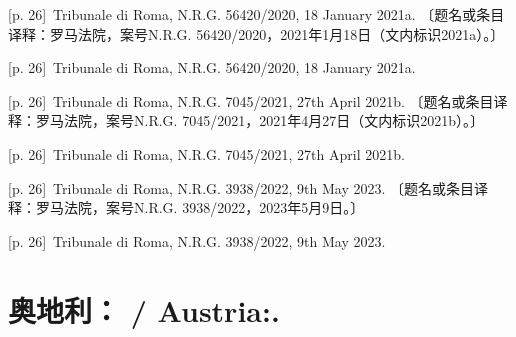\documentclass[10pt,a4paper]{article}
\begin{document}
\noindent\begin{minipage}{\textwidth}\begin{minipage}[t]{\dimexpr.5\textwidth-4mm\relax}{\scriptsize\color{gray} [p. 26]}\ Tribunale di Roma, N.R.G. 56420/2020, 18 January 2021a. 〔题名或条目译释：罗马法院，案号N.R.G. 56420/2020，2021年1月18日（文内标识2021a）。〕\par\end{minipage}\hfill\begin{minipage}[t]{\dimexpr.5\textwidth-4mm\relax}{\scriptsize\color{gray} [p. 26]}\ Tribunale di Roma, N.R.G. 56420/2020, 18 January 2021a.\par\end{minipage}\end{minipage}\par
\noindent\begin{minipage}{\textwidth}\begin{minipage}[t]{\dimexpr.5\textwidth-4mm\relax}{\scriptsize\color{gray} [p. 26]}\ Tribunale di Roma, N.R.G. 7045/2021, 27th April 2021b. 〔题名或条目译释：罗马法院，案号N.R.G. 7045/2021，2021年4月27日（文内标识2021b）。〕\par\end{minipage}\hfill\begin{minipage}[t]{\dimexpr.5\textwidth-4mm\relax}{\scriptsize\color{gray} [p. 26]}\ Tribunale di Roma, N.R.G. 7045/2021, 27th April 2021b.\par\end{minipage}\end{minipage}\par
\noindent\begin{minipage}{\textwidth}\begin{minipage}[t]{\dimexpr.5\textwidth-4mm\relax}{\scriptsize\color{gray} [p. 26]}\ Tribunale di Roma, N.R.G. 3938/2022, 9th May 2023. 〔题名或条目译释：罗马法院，案号N.R.G. 3938/2022，2023年5月9日。〕\par\end{minipage}\hfill\begin{minipage}[t]{\dimexpr.5\textwidth-4mm\relax}{\scriptsize\color{gray} [p. 26]}\ Tribunale di Roma, N.R.G. 3938/2022, 9th May 2023.\par\end{minipage}\end{minipage}\par
{}\section*{奥地利： / Austria:.}
\end{document}
